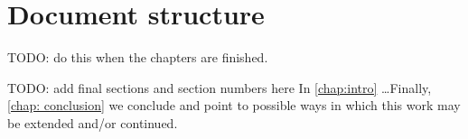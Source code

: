 \section{Document structure}\label{section:intro_structure}

{\color{red} TODO: do this when the chapters are finished.}

{\color{red} TODO: add final sections and section numbers here In \autoref{chap:intro} \ldots Finally, \autoref{chap: conclusion} we conclude and point to possible ways in which this work may be extended and/or continued.}



